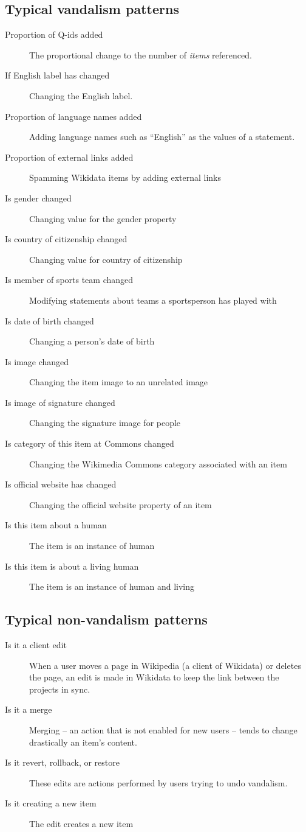 \documentclass{sig-alternate-2013}
\begin{document}
\subsection{Typical vandalism patterns}
\begin{description}
\item[Proportion of Q-ids added] The proportional change to the number of \textit{items} referenced.
\item[If English label has changed] Changing the English label.
\item[Proportion of language names added]  Adding language names such as ``English'' as the values of a statement.
\item[Proportion of external links added]  Spamming Wikidata items by adding external links
\item[Is gender changed] Changing value for the gender property
\item[Is country of citizenship changed]  Changing value for country of citizenship
\item[Is member of sports team changed] Modifying statements about teams a sportsperson has played with
\item[Is date of birth changed]  Changing a person's date of birth
\item[Is image changed]  Changing the item image to an unrelated image
\item[Is image of signature changed]  Changing the signature image for people
\item[Is category of this item at Commons changed]  Changing the Wikimedia Commons category associated with an item
\item[Is official website has changed]  Changing the official website property of an item
\item[Is this item about a human]  The item is an instance of human
\item[Is this item is about a living human]  The item is an instance of human and living
\end{description}
\subsection{Typical non-vandalism patterns}
\begin{description}
\item[Is it a client edit] When a user moves a page in Wikipedia (a client of Wikidata) or deletes the page, an edit is made in Wikidata to keep the link between the projects in sync.
\item[Is it a merge] Merging -- an action that is not enabled for new users -- tends to change drastically an item's content.
\item[Is it revert, rollback, or restore] These edits are actions performed by users trying to undo vandalism.
\item[Is it creating a new item] The edit creates a new item
\end{description}
\end{document}
